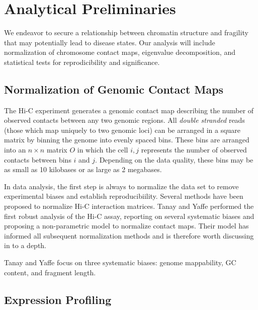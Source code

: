 
\chapter{Analytical Preliminaries}

We endeavor to secure a relationship between chromatin structure and fragility that may potentially lead to disease states.  Our
analysis will include normalization of chromosome contact maps, eigenvalue decomposition, and statistical tests for reprodicibility
and significance.

\section*{Normalization of Genomic Contact Maps}

The Hi-C experiment generates a genomic contact map describing the number of observed contacts between any two genomic
regions.  All \textit{double stranded} reads (those which map uniquely to two genomic loci) can be arranged in a square
matrix by binning the genome into evenly spaced bins.  These bins are arranged into an $n \times n$ matrix $O$ in which the
cell $i,j$ represents the number of observed contacts between bins $i$ and $j$.  Depending on the data quality, these bins
may be as small as 10 kilobases or as large as 2 megabases.

In data analysis, the first step is always to normalize the data set to remove experimental biases and establish reproducibiility.
Several methods have been proposed to normalize Hi-C interaction matrices.  Tanay and Yaffe\cite{tanay2011} performed the first 
robust analysis of the Hi-C assay, reporting on several systematic biases and proposing a non-parametric model to normalize contact
maps.  Their model has informed all subsequent normalization methods and is therefore worth discussing in to a depth.

Tanay and Yaffe focus on three systematic biases: genome mappability, GC content, and fragment length.  





\section*{Expression Profiling}

